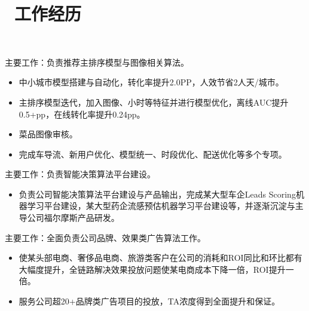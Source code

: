 \documentclass{resume}
\begin{document}



\section{\faUsers\ 工作经历}

\
\begin{onehalfspacing}
主要工作：负责推荐主排序模型与图像相关算法。
\begin{itemize}
\item 中小城市模型搭建与自动化，转化率提升2.0PP，人效节省2人天/城市。 
\item 主排序模型迭代，加入图像、小时等特征并进行模型优化，离线AUC提升0.5+pp，在线转化率提升0.24pp。
\item 菜品图像审核。
\item 完成车导流、新用户优化、模型统一、时段优化、配送优化等多个专项。
\end{itemize}
\end{onehalfspacing}

\begin{onehalfspacing}
主要工作：负责智能决策算法平台建设。
\begin{itemize}
\item  负责公司智能决策算法平台建设与产品输出，完成某大型车企Leads Scoring机器学习平台建设，某大型药企流感预估机器学习平台建设等，并逐渐沉淀与主导公司福尔摩斯产品研发。
\end{itemize}
\end{onehalfspacing}

\begin{onehalfspacing}
主要工作：全面负责公司品牌、效果类广告算法工作。
\begin{itemize}
\item 使某头部电商、奢侈品电商、旅游类客户在公司的消耗和ROI同比和环比都有大幅度提升，全链路解决效果投放问题使某电商成本下降一倍，ROI提升一倍。
\item 服务公司超20+品牌类广告项目的投放，TA浓度得到全面提升和保证。
\end{itemize}
\end{onehalfspacing}
\end{document}
